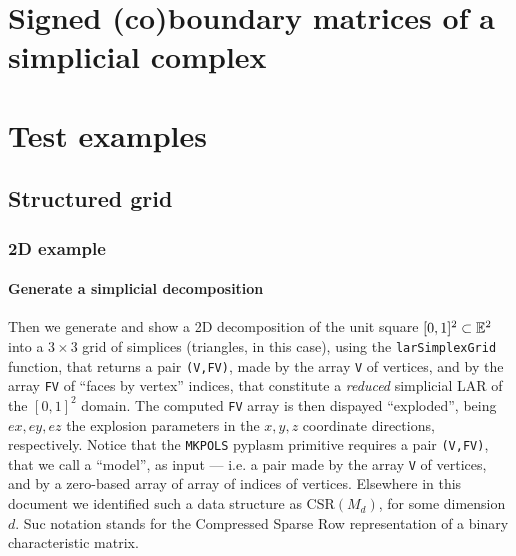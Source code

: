 \documentclass[11pt,oneside]{article}	%
\begin{document}
\section{Signed (co)boundary matrices of a simplicial complex}
\label{simplicial}

\section{Test examples}

\subsection{Structured grid}

\subsubsection{2D example}

\paragraph{Generate a simplicial decomposition}
Then we generate and show a 2D decomposition of the unit square $[0,1]^2\subset\mathbb{E}^2$ into a $3\times 3$ grid of simplices (triangles, in this case), using the \texttt{larSimplexGrid} function, that returns a pair \texttt{(V,FV)}, made by the array \texttt{V} of vertices, and by the array \texttt{FV} of ``faces by vertex'' indices, that constitute a \emph{reduced} simplicial LAR of the $[0,1]^2$ domain. The computed \texttt{FV} array is then dispayed ``exploded'', being $ex,ey,ez$ the explosion parameters in the $x,y,z$ coordinate directions, respectively. Notice that the \texttt{MKPOLS} pyplasm primitive requires a pair \texttt{(V,FV)}, that we call a ``model'', as input --- i.e. a pair made by the array \texttt{V} of vertices, and by a zero-based array of array of indices of vertices. Elsewhere in this document we identified such a data structure as CSR$(M_d)$, for some dimension $d$. Suc notation stands for the Compressed Sparse Row representation of a binary characteristic matrix.
\end{document}
